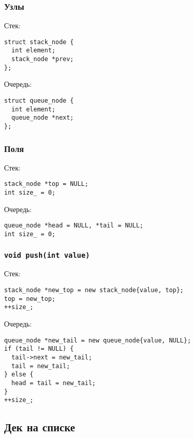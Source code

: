 \documentclass[pdf,russian,aspectratio=169]{beamer}
\begin{document}
\begin{frame}[fragile]
  \frametitle{Узлы}
  Стек:
  \begin{verbatim}
struct stack_node {
  int element;
  stack_node *prev;
};
  \end{verbatim}
  \pause
  \vspace{1em}
  Очередь:
  \begin{verbatim}
struct queue_node {
  int element;
  queue_node *next;
};
  \end{verbatim}
\end{frame}

\begin{frame}[fragile]
  \frametitle{Поля}
  Стек:
  \begin{verbatim}
stack_node *top = NULL;
int size_ = 0;
  \end{verbatim}
  \pause
  \vspace{1em}
  Очередь:
  \begin{verbatim}
queue_node *head = NULL, *tail = NULL;
int size_ = 0;
  \end{verbatim}
\end{frame}

\begin{frame}[fragile]
  \frametitle{\texttt{void push(int value)}}
  Стек:
  \begin{verbatim}
stack_node *new_top = new stack_node{value, top};
top = new_top;
++size_;
  \end{verbatim}
  \pause
  \vspace{1em}
  Очередь:
  \begin{verbatim}
queue_node *new_tail = new queue_node{value, NULL};
if (tail != NULL) {
  tail->next = new_tail;
  tail = new_tail;
} else {
  head = tail = new_tail;
}
++size_;
  \end{verbatim}
\end{frame}

\subsection{Дек на списке}
\end{document}
